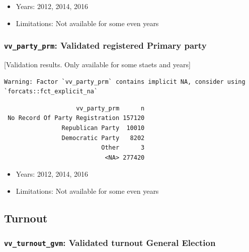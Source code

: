 \documentclass[10pt,article,oneside]{memoir}
\theoremstyle{definition}
\begin{document}
\begin{itemize}
\tightlist
\item
  Years: 2012, 2014, 2016
\item
  Limitations: Not available for some even years
\end{itemize}

\hypertarget{vv_party_prm-validated-registered-primary-party}{%
\subsubsection{\texorpdfstring{\texttt{vv\_party\_prm}: Validated
registered Primary
party}{vv\_party\_prm: Validated registered Primary party}}\label{vv_party_prm-validated-registered-primary-party}}

{[}Validation results. Only available for some staets and years{]}

\begin{verbatim}
Warning: Factor `vv_party_prm` contains implicit NA, consider using
`forcats::fct_explicit_na`
\end{verbatim}

\begin{verbatim}
                    vv_party_prm      n
 No Record Of Party Registration 157120
                Republican Party  10010
                Democratic Party   8202
                           Other      3
                            <NA> 277420
\end{verbatim}

\begin{itemize}
\tightlist
\item
  Years: 2012, 2014, 2016
\item
  Limitations: Not available for some even years
\end{itemize}

\hypertarget{turnout}{%
\subsection{Turnout}\label{turnout}}

\hypertarget{vv_turnout_gvm-validated-turnout-general-election}{%
\subsubsection{\texorpdfstring{\texttt{vv\_turnout\_gvm}: Validated
turnout General
Election}{vv\_turnout\_gvm: Validated turnout General Election}}\label{vv_turnout_gvm-validated-turnout-general-election}}
\end{document}
